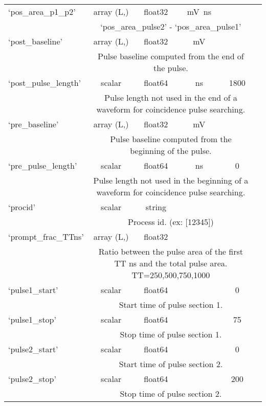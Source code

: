 \begin{center}
\begin{longtable}[!htbp]{|l||*{5}{c|}}
	 	`pos\_area\_p1\_p2' & array (L,) & float32 & \si{\mV\ns}&  \\\cline{2-6} & \multicolumn{4}{m{27em}|}{ `pos\_area\_pulse2' - `pos\_area\_pulse1'}\\\hline 
	 	`post\_baseline' & array (L,) & float32 & \si{\mV}&  \\\cline{2-6} & \multicolumn{4}{m{27em}|}{Pulse baseline computed from the end of the pulse.}\\\hline
	 	`post\_pulse\_length' & scalar & float64 & \si{\ns} & 1800 \\\cline{2-6} & \multicolumn{4}{m{27em}|}{Pulse length not used in the end of a waveform for coincidence pulse searching.}\\\hline
	 	`pre\_baseline' & array (L,) & float32 & \si{\mV}&  \\\cline{2-6} & \multicolumn{4}{m{27em}|}{Pulse baseline computed from the beginning of the pulse.}\\\hline
	 	`pre\_pulse\_length' & scalar & float64 & \si{\ns} & 0 \\\cline{2-6} & \multicolumn{4}{m{27em}|}{Pulse length not used in the beginning of a waveform for coincidence pulse searching.}\\\hline
	 	`procid' & scalar & string &  &  \\\cline{2-6} & \multicolumn{4}{m{27em}|}{Process id. (ex: [12345])}\\\hline
	 	`prompt\_frac\_TTns' & array (L,) & float32 & &  \\\cline{2-6} & \multicolumn{4}{m{27em}|}{Ratio between the pulse area of the first TT \si{\ns} and the total pulse area. TT=250,500,750,1000}\\\hline
		
	 	`pulse1\_start' & scalar & float64 & \si{\sample} & 0 \\\cline{2-6} & \multicolumn{4}{m{27em}|}{Start time of pulse section 1.}\\\hline
	 	`pulse1\_stop' & scalar & float64 & \si{\sample} & 75 \\\cline{2-6} & \multicolumn{4}{m{27em}|}{Stop time of pulse section 1.}\\\hline
	 	`pulse2\_start' & scalar & float64 & \si{\sample} & 0 \\\cline{2-6} & \multicolumn{4}{m{27em}|}{Start time of pulse section 2.}\\\hline
	 	`pulse2\_stop' & scalar & float64 & \si{\sample} & 200 \\\cline{2-6} & \multicolumn{4}{m{27em}|}{Stop time of pulse section 2.}\\\hline		
		

\end{longtable}
\end{center}
